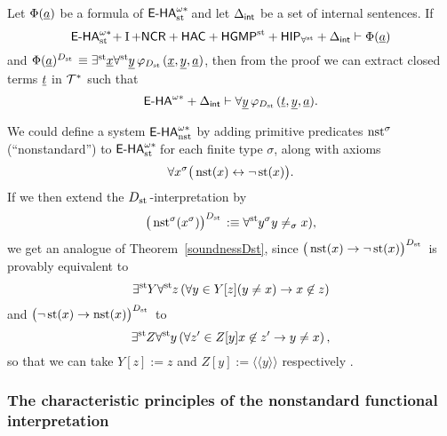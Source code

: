 \begin{thm} \label{soundnessDst}
Let $\Phi (\tup{a})$ be a formula of $\ehaststar$ and let $\Delta_{\intern}$ be a set of internal sentences.
If
\[
    \ehaststar + \I + \NCR + \HAC + \HGMP
    +  \HIP_{\forallst} + \Delta_{\intern} \vdash \Phi (\tup{a})
\]
and $\Phi(\tup{a})^{\D}\equiv\existsst \tup{x}\forallst \tup{y} \, \phi_{\D} (\tup{x},\tup{y},\tup{a})$,
then from the proof we can extract closed terms $\tup{t}$ in $\Tstar$ such that
\[
    \ehastar +\Delta_{\intern} \vdash \forall \tup{y} \, \phi_{\D} (\tup{t},\tup{y},\tup{a}).
\]
\end{thm}

\begin{remark} \label{hanst} We could define a system $\ehanststar$ by adding primitive predicates $\nst^{\sigma}$ (``nonstandard'') to $\ehaststar$ for each finite type $\sigma$, along with axioms
\[
          \forall x^{\sigma} \big(\nst (x) \leftrightarrow \lnot \st (x)\big).
\]
If we then extend the $\D$-interpretation by
\[
      \big(\nst^{\sigma}(x^{\sigma})\big)^{\D} :\equiv \forallst y^{\sigma}  y \neq_{\sigma} x),
\]
we get an analogue of Theorem~\ref{soundnessDst}, since $\big(  \nst (x) \to \lnot \st (x) \big)^{\D}$
is provably equivalent to
\[
     \existsst Y \forallst z \left( \forall y \in Y[z] (y \neq x) \to  x \not\in z \right)
\]
and $\big( \lnot \st (x) \to \nst(x)\big)^{\D}$
to
\[
     \existsst Z \forallst y \left( \forall z' \in Z[y] x \not\in z' \to y\neq x \right),
\]
so that we can take $Y[z] :=z$ and $Z[y] := \langle \langle y \rangle \rangle$  respectively .


\end{remark}

\subsubsection*{The characteristic principles of the nonstandard functional interpretation}

